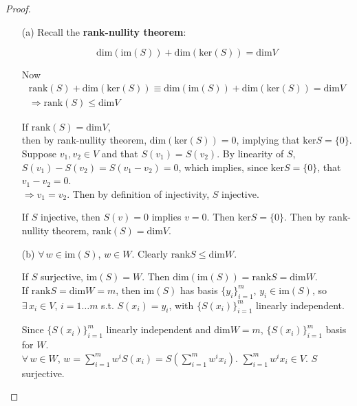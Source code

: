 \begin{proof}
\begin{enumerate}
\item[(a)] Recall the \textbf{rank-nullity theorem}:  
\begin{theorem} 
	\begin{equation}
	\text{dim}(\text{im}(S)) + \text{dim}(\text{ker}(S)) = \text{dim}V  
	\end{equation}			
\end{theorem} 
Now
\[
\begin{gathered}
\text{rank}(S) + \text{dim}(\text{ker}(S)) \equiv \text{dim}(\text{im}(S)) + \text{dim}(\text{ker}(S)) = \text{dim}V  \\
\Longrightarrow \boxed{ 	\text{rank}(S) \leq \text{dim}V  }
\end{gathered}
\]

If $\text{rank}(S) = \text{dim}{V}$, \\
then by rank-nullity theorem, $\text{dim}(\text{ker}(S)) = 0$, implying that $\text{ker}S = \lbrace 0 \rbrace$.  \\
Suppose $v_1, v_2 \in V$ and that $S(v_1) = S(v_2) $.  By linearity of $S$, $S(v_1) - S(v_2) = S(v_1-v_2) = 0$, which implies, since $\text{ker}S = \lbrace 0 \rbrace$, that $v_1 - v_2 = 0$.  \\
$\Longrightarrow v_1 = v_2$.  Then by definition of injectivity, $S$ injective.  

If $S$ injective, then $S(v)=0$ implies $v=0$.  Then $\text{ker}S = \lbrace 0 \rbrace$.  Then by rank-nullity theorem, $\text{rank}(S) = \text{dim}{V}$.  

\item[(b)] 		$\forall \, w \in \text{im}(S)$, $w\in W$.  Clearly $\text{rank}S \leq \text{dim}W$.  

If $S$ surjective, $\text{im}(S) = W$.  Then $\text{dim}(\text{im}(S)) = \text{rank}S = \text{dim}W$.  \\

If $\text{rank}S = \text{dim}W = m$, then $\text{im}(S)$ has basis $\lbrace y_i \rbrace_{i=1}^m$, $y_i \in \text{im}(S)$, so $\exists \, x_i \in V$, $i=1\dots m$ s.t. $S(x_i) = y_i$, with $\lbrace S(x_i) \rbrace_{i=1}^m $ linearly independent.  

Since $\lbrace S(x_i) \rbrace_{i=1}^m$ linearly independent and $\text{dim}W = m$, $\lbrace S(x_i) \rbrace_{i=1}^m$ basis for $W$.   \\
$\forall \, w \in W$, $w=\sum_{i=1}^m w^i S(x_i) = S(\sum_{i=1}^m w^i x_i)$.  $\sum_{i=1}^m w^i x_i \in V$.  $S$ surjective.  


\end{enumerate}
\end{proof}
